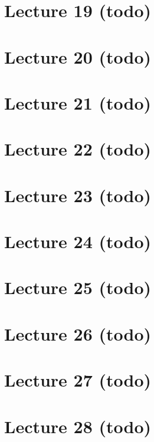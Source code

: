 \hypertarget{lecture-19-todo}{%
\section{Lecture 19 (todo)}\label{lecture-19-todo}}

\hypertarget{lecture-20-todo}{%
\section{Lecture 20 (todo)}\label{lecture-20-todo}}

\hypertarget{lecture-21-todo}{%
\section{Lecture 21 (todo)}\label{lecture-21-todo}}

\hypertarget{lecture-22-todo}{%
\section{Lecture 22 (todo)}\label{lecture-22-todo}}

\hypertarget{lecture-23-todo}{%
\section{Lecture 23 (todo)}\label{lecture-23-todo}}

\hypertarget{lecture-24-todo}{%
\section{Lecture 24 (todo)}\label{lecture-24-todo}}

\hypertarget{lecture-25-todo}{%
\section{Lecture 25 (todo)}\label{lecture-25-todo}}

\hypertarget{lecture-26-todo}{%
\section{Lecture 26 (todo)}\label{lecture-26-todo}}

\hypertarget{lecture-27-todo}{%
\section{Lecture 27 (todo)}\label{lecture-27-todo}}

\hypertarget{lecture-28-todo}{%
\section{Lecture 28 (todo)}\label{lecture-28-todo}}

